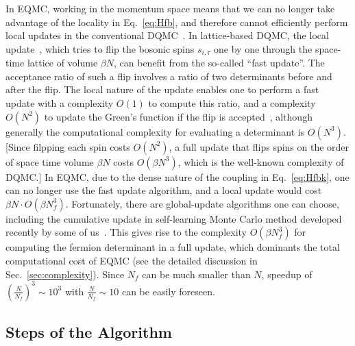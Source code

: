 \documentclass[aps,prx,twocolumn,superscriptaddress,showpacs,floatfix]{revtex4-1}
\begin{document}
In EQMC, working in the momentum space means that we can no longer take advantage of the locality in Eq.~\eqref{eq:Hfb}, and therefore cannot efficiently perform local updates in the conventional DQMC~\cite{AssaadEvertz2008}.
In lattice-based DQMC, the local update~\cite{BSS1981,Hirsch_1983,Hirsch_1985,AssaadEvertz2008}, which tries to flip the bosonic spins $s_{i,\tau}$ one by one through the space-time lattice of volume $\beta N$, can benefit from the so-called ``fast update''. The acceptance ratio of such a flip involves a ratio of two determinants before and after the flip.
The local nature of the update enables one to perform a fast update with a complexity $O(1)$ to compute this ratio, and a complexity $O(N^2)$ to update the Green's function if the flip is accepted~\cite{BSS1981}, although generally
the computational complexity for evaluating a determinant is $O(N^3)$.
[Since filpping each spin costs $O(N^2)$, a full update that flips spins on the order of space time volume $\beta N$ costs $O(\beta N^3)$, which is the well-known complexity of DQMC.]
In EQMC, due to the dense nature of the coupling in Eq.~\eqref{eq:Hfbk}, one can no longer use the fast update algorithm, and a local update would cost $\beta N\cdot O(\beta N_f^3)$.
Fortunately, there are global-update algorithms one can choose, including the cumulative update in self-learning Monte Carlo method developed recently by some of us~\cite{liu2016fermion,Xu2016self}. This gives rise to the complexity $O(\beta N_f^3)$ for computing the fermion determinant in a full update, which dominants the total computational cost of EQMC (see the detailed discussion in Sec.~\ref{sec:complexity}). Since $N_f$ can be much smaller than $N$, speedup of $(\frac{N}{N_f})^3 \sim 10^3$ with $\frac{N}{N_f} \sim 10$ can be easily foreseen.



\subsection{Steps of the Algorithm}
\label{sec:steps}
\end{document}

